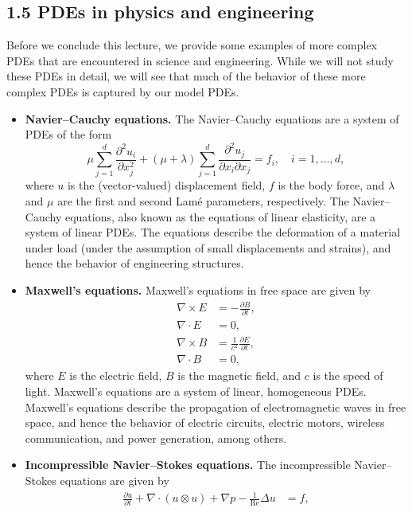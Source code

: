 \subsection{1.5 PDEs in physics and engineering}
Before we conclude this lecture, we provide some examples of more complex PDEs that are encountered in science and engineering. While we will not study these PDEs in detail, we will see that much of the behavior of these more complex PDEs is captured by our model PDEs.
\begin{itemize}
    \item \textbf{Navier--Cauchy equations.} The Navier--Cauchy equations are a system of PDEs of the form
    \[\mu \sum_{j=1}^{d} \frac{\partial^2 u_i}{\partial x_j^2} + (\mu + \lambda) \sum_{j=1}^{d} \frac{\partial^2 u_j}{\partial x_i \partial x_j} = f_i, \quad i = 1, \dots, d,\]
    where $u$ is the (vector-valued) displacement field, $f$ is the body force, and $\lambda$ and $\mu$ are the first and second Lam\'e parameters, respectively. The Navier--Cauchy equations, also known as the equations of linear elasticity, are a system of linear PDEs. The equations describe the deformation of a material under load (under the assumption of small displacements and strains), and hence the behavior of engineering structures.
    \item \textbf{Maxwell's equations.} Maxwell's equations in free space are given by
    \begin{align*}
        \nabla \times E &= -\frac{\partial B}{\partial t}, \\
        \nabla \cdot E &= 0, \\
        \nabla \times B &= \frac{1}{c^2} \frac{\partial E}{\partial t}, \\
        \nabla \cdot B &= 0,
    \end{align*}
    where $E$ is the electric field, $B$ is the magnetic field, and $c$ is the speed of light. Maxwell's equations are a system of linear, homogeneous PDEs. Maxwell's equations describe the propagation of electromagnetic waves in free space, and hence the behavior of electric circuits, electric motors, wireless communication, and power generation, among others.
    \item \textbf{Incompressible Navier--Stokes equations.} The incompressible Navier--Stokes equations are given by
    \begin{align*}
        \frac{\partial u}{\partial t} + \nabla \cdot (u \otimes u) + \nabla p - \frac{1}{\mathrm{Re}} \Delta u &= f, \\

\end{align*}
\end{itemize}
